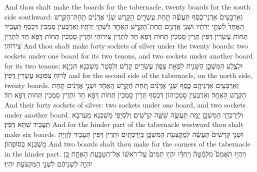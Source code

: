 {{And thou shalt make the boards for the tabernacle, twenty boards for the south side southward:}{}
{וְאַרְבָּעִים֙ אַדְנֵי־כֶ֔סֶף תַּעֲשֶׂ֕ה תַּ֖חַת עֶשְׂרִ֣ים הַקָּ֑רֶשׁ שְׁנֵ֨י אֲדָנִ֜ים תַּֽחַת־הַקֶּ֤רֶשׁ הָאֶחָד֙ לִשְׁתֵּ֣י יְדֹתָ֔יו וּשְׁנֵ֧י אֲדָנִ֛ים תַּֽחַת־הַקֶּ֥רֶשׁ הָאֶחָ֖ד לִשְׁתֵּ֥י יְדֹתָֽיו׃}
{וְאַרְבְּעִין סָמְכִין דִּכְסַף תַּעֲבֵיד תְּחוֹת עֶשְׂרִין דַּפִּין תְּרֵין סָמְכִין תְּחוֹת דַּפָּא חַד לִתְרֵין צִירוֹהִי וּתְרֵין סָמְכִין תְּחוֹת דַּפָּא חַד לִתְרֵין צִירוֹהִי׃}
{And thou shalt make forty sockets of silver under the twenty boards: two sockets under one board for its two tenons, and two sockets under another board for its two tenons;}{}
{וּלְצֶ֧לַע הַמִּשְׁכָּ֛ן הַשֵּׁנִ֖ית לִפְאַ֣ת צָפ֑וֹן עֶשְׂרִ֖ים קָֽרֶשׁ׃}
{וְלִסְטַר מַשְׁכְּנָא תִּנְיָנָא לְרוּחַ צִפּוּנָא עֶשְׂרִין דַּפִּין׃}
{and for the second side of the tabernacle, on the north side, twenty boards.}{}
{וְאַרְבָּעִ֥ים אַדְנֵיהֶ֖ם כָּ֑סֶף שְׁנֵ֣י אֲדָנִ֗ים תַּ֚חַת הַקֶּ֣רֶשׁ הָֽאֶחָ֔ד וּשְׁנֵ֣י אֲדָנִ֔ים תַּ֖חַת הַקֶּ֥רֶשׁ הָאֶחָֽד׃}
{וְאַרְבְּעִין סָמְכֵיהוֹן דִּכְסַף תְּרֵין סָמְכִין תְּחוֹת דַּפָּא חַד וּתְרֵין סָמְכִין תְּחוֹת דַּפָּא חַד׃}
{And their forty sockets of silver: two sockets under one board, and two sockets under another board.}{}
{וּֽלְיַרְכְּתֵ֥י הַמִּשְׁכָּ֖ן יָ֑מָּה תַּעֲשֶׂ֖ה שִׁשָּׁ֥ה קְרָשִֽׁים׃
}
{וְלִסְיָפֵי מַשְׁכְּנָא מַעְרְבָא תַּעֲבֵיד שִׁתָּא דַּפִּין׃}
{And for the hinder part of the tabernacle westward thou shalt make six boards.}{}
{וּשְׁנֵ֤י קְרָשִׁים֙ תַּעֲשֶׂ֔ה לִמְקֻצְעֹ֖ת הַמִּשְׁכָּ֑ן בַּיַּרְכָתָֽיִם׃
}
{וּתְרֵין דַּפִּין תַּעֲבֵיד לְזָוְיָת מַשְׁכְּנָא בְּסוֹפְהוֹן׃}
{And two boards shalt thou make for the corners of the tabernacle in the hinder part.}{}
{וְיִֽהְי֣וּ תֹֽאֲמִם֮ מִלְּמַ֒טָּה֒ וְיַחְדָּ֗ו יִהְי֤וּ תַמִּים֙ עַל־רֹאשׁ֔וֹ אֶל־הַטַּבַּ֖עַת הָאֶחָ֑ת כֵּ֚ן יִהְיֶ֣ה לִשְׁנֵיהֶ֔ם לִשְׁנֵ֥י הַמִּקְצֹעֹ֖ת יִהְיֽוּ׃
}}
